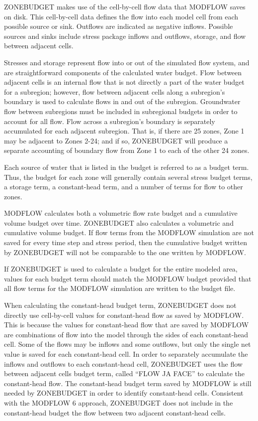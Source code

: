 \documentclass[11pt,twoside,twocolumn]{usgsreport}
\begin{document}
ZONEBUDGET makes use of the cell-by-cell flow data that MODFLOW saves on disk. This cell-by-cell data defines the flow into each model cell from each possible source or sink. Outflows are indicated as negative inflows. Possible sources and sinks include stress package inflows and outflows, storage, and flow between adjacent cells.

Stresses and storage represent flow into or out of the simulated flow system, and are straightforward components of the calculated water budget. Flow between adjacent cells is an internal flow that is not directly a part of the water budget for a subregion; however, flow between adjacent cells along a subregion's boundary is used to calculate flows in and out of the subregion. Groundwater flow between subregions must be included in subregional budgets in order to account for all flow. Flow across a subregion's boundary is separately accumulated for each adjacent subregion. That is, if there are 25 zones, Zone 1 may be adjacent to Zones 2-24; and if so, ZONEBUDGET will produce a separate accounting of boundary flow from Zone 1 to each of the other 24 zones.

Each source of water that is listed in the budget is referred to as a budget term. Thus, the budget for each zone will generally contain several stress budget terms, a storage term, a constant-head term, and a number of terms for flow to other zones.

MODFLOW calculates both a volumetric flow rate budget and a cumulative volume budget over time. ZONEBUDGET also calculates a volumetric and cumulative volume budget.  If flow terms from the MODFLOW simulation are not saved for every time step and stress period, then the cumulative budget written by ZONEBUDGET will not be comparable to the one written by MODFLOW.

If ZONEBUDGET is used to calculate a budget for the entire modeled area, values for each budget term should match the MODFLOW budget provided that all flow terms for the MODFLOW simulation are written to the budget file.

When calculating the constant-head budget term, ZONEBUDGET does not directly use cell-by-cell values for constant-head flow as saved by MODFLOW. This is because the values for constant-head flow that are saved by MODFLOW are combinations of flow into the model through the sides of each constant-head cell. Some of the flows may be inflows and some outflows, but only the single net value is saved for each constant-head cell. In order to separately accumulate the inflows and outflows to each constant-head cell, ZONEBUDGET uses the flow between adjacent cells budget term, called ``FLOW JA FACE'' to calculate the constant-head flow. The constant-head budget term saved by MODFLOW is still needed by ZONEBUDGET in order to identify constant-head cells.  Consistent with the MODFLOW 6 approach, ZONEBUDGET does not include in the constant-head budget the flow between two adjacent constant-head cells.  
\end{document}
